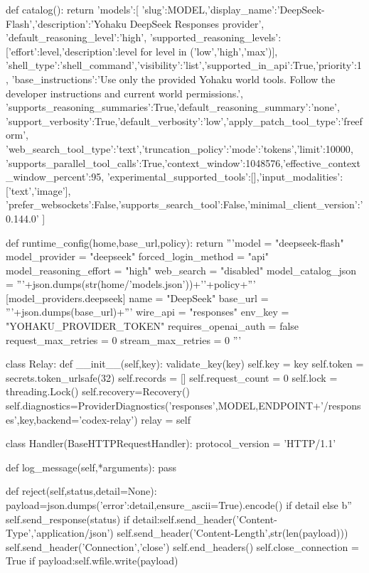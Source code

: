 def catalog():
    return {'models':[{
        'slug':MODEL,'display_name':'DeepSeek-Flash','description':'Yohaku DeepSeek Responses provider',
        'default_reasoning_level':'high',
        'supported_reasoning_levels':[{'effort':level,'description':level} for level in ('low','high','max')],
        'shell_type':'shell_command','visibility':'list','supported_in_api':True,'priority':1,
        'base_instructions':'Use only the provided Yohaku world tools. Follow the developer instructions and current world permissions.',
        'supports_reasoning_summaries':True,'default_reasoning_summary':'none',
        'support_verbosity':True,'default_verbosity':'low','apply_patch_tool_type':'freeform',
        'web_search_tool_type':'text','truncation_policy':{'mode':'tokens','limit':10000},
        'supports_parallel_tool_calls':True,'context_window':1048576,'effective_context_window_percent':95,
        'experimental_supported_tools':[],'input_modalities':['text','image'],
        'prefer_websockets':False,'supports_search_tool':False,'minimal_client_version':'0.144.0'
    }]}


def runtime_config(home,base_url,policy):
    return '''model = "deepseek-flash"
model_provider = "deepseek"
forced_login_method = "api"
model_reasoning_effort = "high"
web_search = "disabled"
model_catalog_json = '''+json.dumps(str(home/'models.json'))+'\n'+policy+'''
[model_providers.deepseek]
name = "DeepSeek"
base_url = '''+json.dumps(base_url)+'''
wire_api = "responses"
env_key = "YOHAKU_PROVIDER_TOKEN"
requires_openai_auth = false
request_max_retries = 0
stream_max_retries = 0
'''


class Relay:
    def __init__(self,key):
        validate_key(key)
        self.key = key
        self.token = secrets.token_urlsafe(32)
        self.records = []
        self.request_count = 0
        self.lock = threading.Lock()
        self.recovery=Recovery()
        self.diagnostics=ProviderDiagnostics('responses',MODEL,ENDPOINT+'/responses',key,backend='codex-relay')
        relay = self

        class Handler(BaseHTTPRequestHandler):
            protocol_version = 'HTTP/1.1'

            def log_message(self,*arguments):
                pass

            def reject(self,status,detail=None):
                payload=json.dumps({'error':detail},ensure_ascii=True).encode() if detail else b''
                self.send_response(status)
                if detail:self.send_header('Content-Type','application/json')
                self.send_header('Content-Length',str(len(payload)))
                self.send_header('Connection','close')
                self.end_headers()
                self.close_connection = True
                if payload:self.wfile.write(payload)

